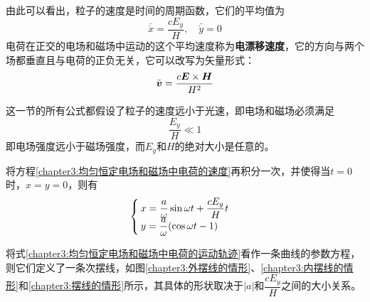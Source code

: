 由此可以看出，粒子的速度是时间的周期函数，它们的平均值为
\begin{equation*}
	\bar{\dot{x}} = \frac{cE_y}{H},\quad \bar{\dot{y}} = 0
\end{equation*}
电荷在正交的电场和磁场中运动的这个平均速度称为{\bf 电漂移速度}，它的方向与两个场都垂直且与电荷的正负无关，它可以改写为矢量形式：
\begin{equation}
	\bar{\boldsymbol{v}} = \frac{c\boldsymbol{E}\times \boldsymbol{H}}{H^2}
	\label{chapter3:电漂移速度}
\end{equation}

这一节的所有公式都假设了粒子的速度远小于光速，即电场和磁场必须满足
\begin{equation}
	\frac{E_y}{H} \ll 1
\end{equation}
即电场强度远小于磁场强度，而$E_y$和$H$的绝对大小是任意的。

将方程\eqref{chapter3:均匀恒定电场和磁场中电荷的速度}再积分一次，并使得当$t=0$时，$x=y=0$，则有
\begin{equation}
\begin{cases}
	\displaystyle x = \frac{a}{\omega}\sin\omega t+\frac{cE_y}{H}t \\
	\displaystyle y = \frac{a}{\omega}(\cos \omega t - 1)
\end{cases}
\label{chapter3:均匀恒定电场和磁场中电荷的运动轨迹}
\end{equation}

将式\eqref{chapter3:均匀恒定电场和磁场中电荷的运动轨迹}看作一条曲线的参数方程，则它们定义了一条次摆线，如图\ref{chapter3:外摆线的情形}、\ref{chapter3:内摆线的情形}和\ref{chapter3:摆线的情形}所示，其具体的形状取决于$|a|$和$\dfrac{cE_y}{H}$之间的大小关系。

